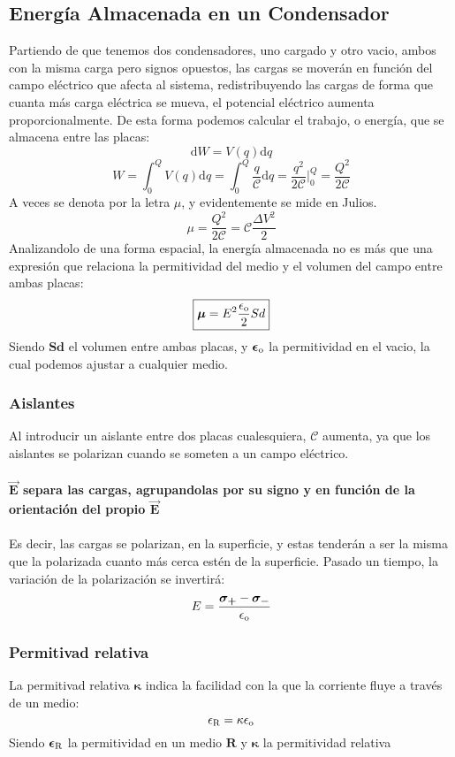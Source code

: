 \subsection{Energía Almacenada en un Condensador}
\noindent Partiendo de que tenemos dos condensadores, uno cargado y otro vacio, ambos con la misma carga pero signos opuestos, las cargas se moverán en función del campo eléctrico que afecta al sistema, redistribuyendo las cargas de forma que cuanta más carga eléctrica se mueva, el potencial eléctrico aumenta proporcionalmente. De esta forma podemos calcular el trabajo, o energía, que se almacena entre las placas:
\[
        \mathrm{d}W = V(q)\mathrm{d}q
\]
\[
        W = \int_{0}^{Q} V(q)\mathrm{d}q = \int_{0}^{Q} \frac{q}{\mathcal{C}}\mathrm{d}q = \frac{q^2}{2\mathcal{C}} \Big|^Q_0 =\frac{Q^2}{2\mathcal{C}}
\]
A veces se denota por la letra \(\bm{\mathcal{\mu}}\), y evidentemente se mide en Julios.
\[
        \boxed{\bm{\mathcal{\mu}} = \frac{Q^2}{2\mathcal{C}} = \mathcal{C}\frac{\Delta V^2}{2}}
\]
Analizandolo de una forma espacial, la energía almacenada no es más que una expresión que relaciona la permitividad del medio y el volumen del campo entre ambas placas:
\[
        \boxed{\bm{\mathcal{\mu}} = E^2 \frac{\epsilon_\textnormal{o}}{2}Sd}
\]
Siendo \(\bm{Sd}\) el volumen entre ambas placas, y \(\bm{\epsilon_\textnormal{o}}\) la permitividad en el vacio, la cual podemos ajustar a cualquier medio.
\subsubsection{Aislantes}
\noindent Al introducir un aislante entre dos placas cualesquiera, \(\bm{\mathcal{C}}\) aumenta, ya que los aislantes se polarizan cuando se someten a un campo eléctrico.\\\\ \textbf{\(\bm{\vec{E}}\) separa las cargas, agrupandolas por su signo y en función de la orientación del propio \(\bm{\vec{E}}\)}
\\\\
Es decir, las cargas se polarizan, en la superficie, y estas tenderán a ser la misma que la polarizada cuanto más cerca estén de la superficie. Pasado un tiempo, la variación de la polarización se invertirá:
\[
        E = \frac{\bm{\sigma_+}-\bm{\sigma_-}}{\epsilon_{\textnormal{o}}}
\]
\subsubsection{Permitivad relativa}
\noindent La permitivad relativa \(\bm{\kappa }\) indica la facilidad con la que la corriente fluye a través de un medio:
\[
        \epsilon_\textnormal{R} = \kappa \epsilon_\textnormal{o}
\]
Siendo \(\bm{\epsilon_\textnormal{R}}\) la permitividad en un medio \(\bm{R}\) y \(\bm{\kappa}\) la permitividad relativa
